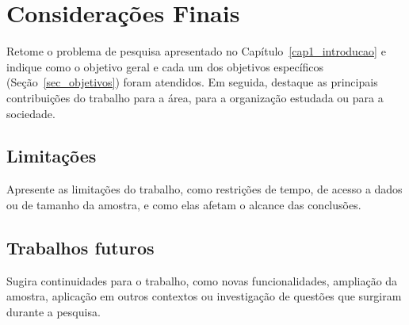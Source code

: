 \chapter{Considerações Finais}
\label{cap5_consideracoes}


Retome o problema de pesquisa apresentado no Capítulo~\ref{cap1_introducao} e indique como o objetivo geral e cada um dos objetivos específicos (Seção~\ref{sec_objetivos}) foram atendidos. Em seguida, destaque as principais contribuições do trabalho para a área, para a organização estudada ou para a sociedade.

\section{Limitações}

Apresente as limitações do trabalho, como restrições de tempo, de acesso a dados ou de tamanho da amostra, e como elas afetam o alcance das conclusões.

\section{Trabalhos futuros}

Sugira continuidades para o trabalho, como novas funcionalidades, ampliação da amostra, aplicação em outros contextos ou investigação de questões que surgiram durante a pesquisa.
